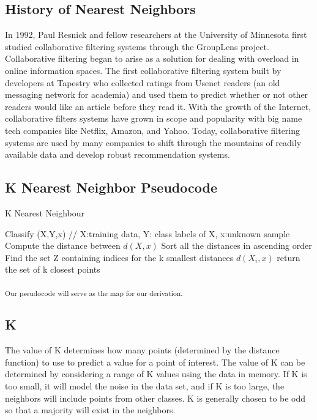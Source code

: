 \documentclass{report}
\begin{document}
\subsection*{History of Nearest Neighbors}

In 1992, Paul Resnick and fellow researchers at the University of Minnesota first studied collaborative filtering systems through the GroupLens project\cite{2}.  Collaborative filtering began to arise as a solution for dealing with overload in online information spaces. The first collaborative filtering system built by developers at Tapestry who collected ratings from Usenet readers (an old messaging network for academia) and
used them to predict whether or not other readers would like an article before they read it.\cite{3} With the growth of the Internet, collaborative filters systems have grown in scope and popularity with big name tech companies like Netflix, Amazon, and Yahoo. Today, collaborative filtering systems are used by many companies to shift through the mountains of readily available data and develop robust recommendation systems.

\subsection*{K Nearest Neighbor Pseudocode }
\begin{algorithm}
  \caption{K Nearest Neighbour}
  \begin{algorithmic}
  	\State Classify (X,Y,x) // X:training data, Y: class labels of X, x:unknown sample
	\State Compute the distance between $d(X, x)$
	\State Sort all the distances in ascending order
	\EndFor
	\State Find the set Z containing indices for the k smallest distances $d(X_{i},x)$
	\State return the set of k closest points 
  \end{algorithmic}
\end{algorithm}
\textsubscript{Our pseudocode will serve as the map for our derivation.}

\subsection*{K}

The value of K determines how many points (determined by the distance function) to use to predict a value for a point of interest.
The value of K can be determined by considering a range of K values using the data in memory.
If K is too small, it will model the noise in the data set, and if K is too large, the neighbors will include points from other classes.
K is generally chosen to be odd so that a majority will exist in the neighbors.
\end{document}
